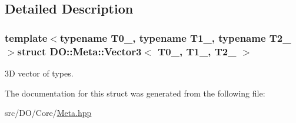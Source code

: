 \subsection{Detailed Description}
\subsubsection*{template$<$typename T0\-\_\-, typename T1\-\_\-, typename T2\-\_\-$>$struct D\-O\-::\-Meta\-::\-Vector3$<$ T0\-\_\-, T1\-\_\-, T2\-\_\- $>$}

3\-D vector of types. 

The documentation for this struct was generated from the following file\-:\begin{DoxyCompactItemize}
\item 
src/\-D\-O/\-Core/\hyperlink{_meta_8hpp}{Meta.\-hpp}\end{DoxyCompactItemize}
